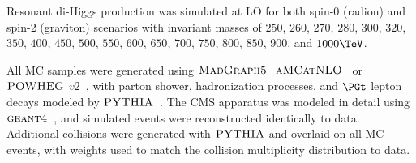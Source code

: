 Resonant di-Higgs production was simulated at LO for both spin-0 (radion) and spin-2 (graviton)
scenarios with invariant masses of $250$, $260$, $270$, $280$, $300$, $320$, $350$, $400$, $450$, $500$, $550$, $600$,
$650$, $700$, $750$, $800$, $850$, $900$, and $1000\TeV$.

All MC samples were generated using $\textsc{MadGraph5\_aMCatNLO}$~\cite{Alwall:2014hca} or
$\textsc{POWHEG}$ $v2$~\cite{Nason:2004rx,Frixione:2007vw,Alioli:2010xd}, with parton shower, hadronization
processes, and $\PGt$ lepton decays modeled by
$\textsc{PYTHIA}$~\cite{PYTHIA_CUETP8M1tune_CMS,PYTHIA_CUETP8M2tune_CMS,Sirunyan:2019dfx,PYTHIA_MonashTune}.
The CMS apparatus was modeled in detail using $\textsc{geant4}$~\cite{Agostinelli:2002hh}, and simulated events
were reconstructed identically to data.  Additional collisions were generated with $\textsc{PYTHIA}$ and
overlaid on all MC events, with weights used to match the collision multiplicity distribution to data.

